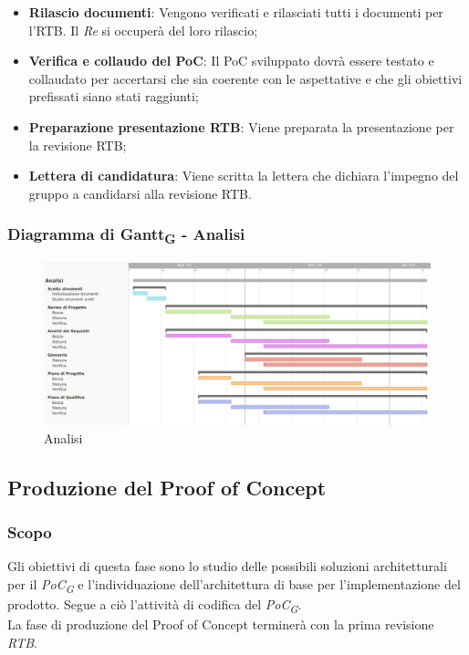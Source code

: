 \:
\begin{itemize}
	\item \textbf{Rilascio documenti}: Vengono verificati e rilasciati tutti i documenti per l'RTB. Il \textit{Re} si occuperà del loro rilascio;
	\item \textbf{Verifica e collaudo del PoC}: Il PoC sviluppato dovrà essere testato e collaudato per accertarsi che sia coerente con le aspettative e che gli obiettivi prefissati siano stati raggiunti;
	\item \textbf{Preparazione presentazione RTB}: Viene preparata la presentazione per la revisione RTB;
	\item \textbf{Lettera di candidatura}: Viene scritta la lettera che dichiara l'impegno del gruppo a candidarsi alla revisione RTB.
\end{itemize}

\subsubsection{Diagramma di Gantt\textsubscript{G} - Analisi}

\begin{figure}[H]
\centering
\includegraphics[width=\textwidth]{img/4_analisi.png}
\caption{Analisi}
\end{figure}

\subsection{Produzione del Proof of Concept}
\subsubsection{Scopo}
Gli obiettivi di questa fase sono lo studio delle possibili soluzioni architetturali per il \textit{PoC\textsubscript{G}} e l’individuazione dell’architettura di base per l’implementazione del prodotto. Segue a ciò l’attività di codifica del \textit{PoC\textsubscript{G}}.\\
La fase di produzione del Proof of Concept terminerà con la prima revisione \textit{RTB}.

